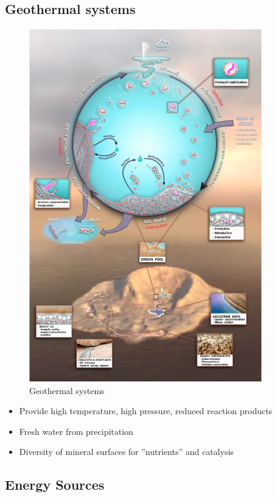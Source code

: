 \documentclass[]{article}
\begin{document}
  
\subsection{Geothermal systems}
\begin{figure}[h!]
	\caption{Geothermal systems \cite{damer2016field}}
	\includegraphics[width=0.9\textwidth]{GeothermalSystems}
\end{figure}

\begin{itemize}
	\item Provide high 	temperature, high
	pressure, reduced	reaction products
	\item Fresh water from 	precipitation
	\item Diversity of mineral	surfaces for ”nutrients” and catalysis
\end{itemize}

\subsection{Energy Sources}
\end{document}
